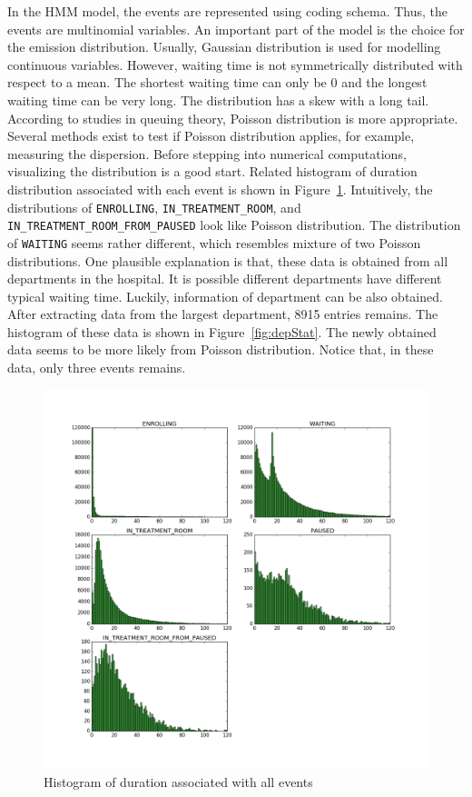 In the HMM model, the events are represented using  coding schema. Thus, the events are multinomial variables. An important part of the model is the choice for the emission distribution. Usually, Gaussian distribution is used for modelling continuous variables. However, waiting time is not symmetrically distributed with respect to a mean. The shortest waiting time can only be 0 and the longest waiting time can be very long. The distribution has a skew with a long tail. According to studies in queuing theory, Poisson distribution is more appropriate. Several methods exist to test if Poisson distribution applies, for example, measuring the dispersion. Before stepping into numerical computations, visualizing the distribution is a good start. Related histogram of duration distribution associated with each event is shown in Figure~\ref{fig:fullStat}. Intuitively, the distributions of \texttt{ENROLLING},  \texttt{IN\_TREATMENT\_ROOM}, and \texttt{IN\_TREATMENT\_ROOM\_FROM\_PAUSED} look like Poisson distribution. The distribution of \texttt{WAITING} seems rather different, which resembles mixture of two Poisson distributions. One plausible explanation is that, these data is obtained from all departments in the hospital. It is possible different departments have different typical waiting time. Luckily, information of department can be also obtained. After extracting data from the largest department, 8915 entries remains. The histogram of these data is shown in Figure~\ref{fig:depStat}. The newly obtained data seems to be more likely from Poisson distribution. Notice that, in these data, only three events remains.


\begin{figure}[!ht]
	\begin{center}
		\includegraphics[width=\textwidth]{images/fullStat}
		\caption{Histogram of duration associated with all events}
		\label{fig:fullStat}
	\end{center}
\end{figure}


